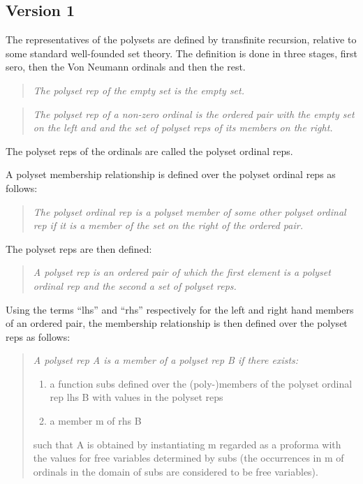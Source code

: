 \documentclass[numreferences]{rbjk}
\begin{document}
\begin{article}
\subsection{Version 1}

The representatives of the polysets are defined by transfinite recursion, relative to some standard well-founded set theory.
The definition is done in three stages, first sero, then the Von Neumann ordinals and then the rest.

\begin{quote}\label{def:polyset rep}
{\it
The polyset rep of the empty set is the empty set.
}
\end{quote}

\begin{quote}
\emph{
The polyset rep of a non-zero ordinal is the ordered pair with the empty set on the left and and the set of polyset reps of its members on the right.
}
\end{quote}

The polyset reps of the ordinals are called the polyset ordinal reps.

A polyset membership relationship is defined over the polyset ordinal reps as follows:

\begin{quote}
\emph{
The polyset ordinal rep is a polyset member of some other polyset ordinal rep if it is a member of the set on the right of the ordered pair.
}
\end{quote}

The polyset reps are then defined:

\begin{quote}
\emph{
A polyset rep is an ordered pair of which the first element is a polyset ordinal rep and the second a set of polyset reps.
}
\end{quote}

Using the terms ``lhs'' and ``rhs'' respectively for the left and right hand members of an ordered pair, the membership relationship is then defined over the polyset reps as follows:

\begin{quotation}
{\it
A polyset rep A is a member of a polyset rep B if there exists:
\begin{enumerate}
\item a function \textsf{subs} defined over the (poly-)members of the polyset ordinal rep \textsf{lhs B} with values in the polyset reps
\item a member \textsf{m} of \textsf{rhs B}
\end{enumerate}
such that A is obtained by instantiating \textsf{m} regarded as a proforma with the values for free variables determined by \textsf{subs} (the occurrences in \textsf{m} of ordinals in the domain of \textsf{subs} are considered to be free variables).
}
\end{quotation}


\end{article}
\end{document}
